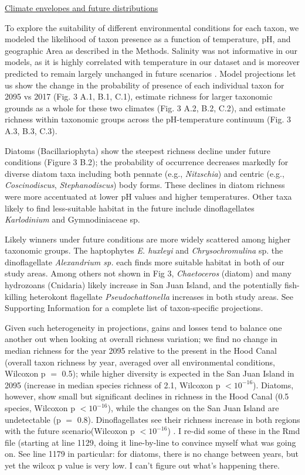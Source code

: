 \documentclass[11pt]{article}
\begin{document}
\begin{linenumbers}
\noindent\underline{Climate envelopes and future distributions}

To explore the suitability of different environmental conditions for each taxon, we modeled the likelihood of taxon presence as a function of temperature, pH, and geographic Area as described in the Methods. Salinity was not informative in our models, as it is highly correlated with temperature in our dataset and is moreover predicted to remain largely unchanged in future scenarios \cite{khangaonkar2019salish}. Model projections let us show the change in the probability of presence of each individual taxon for 2095 vs 2017 (Fig. 3 A.1, B.1, C.1), estimate richness for larger taxonomic grounds as a whole for these two climates (Fig. 3 A.2, B.2, C.2), and estimate richness within taxonomic groups across the pH-temperature continuum (Fig. 3 A.3, B.3, C.3). 

Diatoms (Bacillariophyta) show the steepest richness decline under future conditions (Figure 3 B.2); the probability of occurrence decreases markedly for diverse diatom taxa including both pennate (e.g., \textit{Nitzschia}) and centric (e.g., \textit{Coscinodiscus}, \textit{Stephanodiscus}) body forms. These declines in diatom richness were more accentuated at lower pH values and higher temperatures. Other taxa likely to find less-suitable habitat in the future include dinoflagellates \textit{Karlodinium} and Gymnodiniaceae sp.

Likely winners under future conditions are more widely scattered among higher taxonomic groups. The haptophytes \textit{E. huxleyi} and \textit{Chrysochromulina} sp. the dinoflagellate \textit{Alexandrium sp.} each finds more suitable habitat in both of our study areas. Among others not shown in Fig 3, \textit{Chaetoceros} (diatom) and many hydrozoans (Cnidaria) likely increase in San Juan Island, and the potentially fish-killing heterokont flagellate \textit{Pseudochattonella} increases in both study areas. See Supporting Information for a complete list of taxon-specific projections.
 
Given such heterogeneity in projections, gains and losses tend to balance one another out when looking at overall richness variation; {\color{red} we find no change in median richness for the year 2095 relative to the present in the Hood Canal (overall taxon richness by year, averaged over all environmental conditions, Wilcoxon p $=$ 0.5); while higher diversity is expected in the San Juan Island in 2095 (increase in median species richness of 2.1, Wilcoxon p $< 10^{-16}$). Diatoms, however, show small but significant declines in richness in the Hood Canal (0.5 species, Wilcoxon p $< 10^{-16}$), while the changes on the San Juan Island are undetectable (p $=$ 0.8).  Dinoflagellates see their richness increase in both regions with the future scenario(Wilcoxon p $< 10^{-16}$) }.  {\color{blue} I re-did some of these in the Rmd file (starting at line 1129, doing it line-by-line to convince myself what was going on. See line 1179 in particular: for diatoms, there is no change between years, but yet the wilcox p value is very low. I can't figure out what's happening there.}
 


\end{linenumbers}
\end{document}
